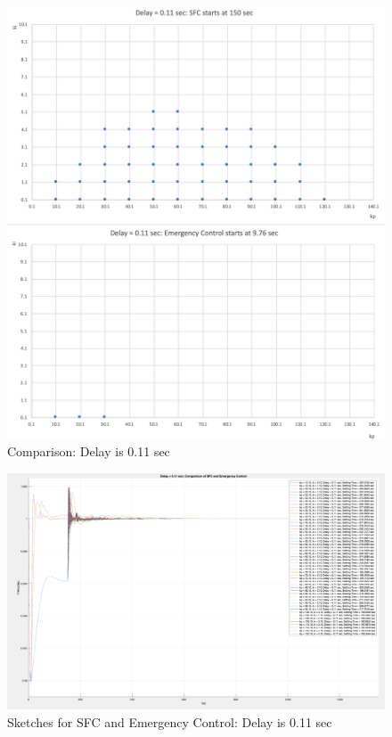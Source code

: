 \begin{figure}[htbp]
\centering
\includegraphics[width = .891\textwidth]{figure/6_4_copare_11.png}
\caption{Comparison: Delay is 0.11 sec}
\label{6_4_copare_11}
\end{figure}


\begin{figure}[htbp]
\centering
\includegraphics[width = .891\textwidth]{figure/6_4_CompaPlots_11.png}
\caption{Sketches for SFC and Emergency Control: Delay is 0.11 sec}
\label{6_4_CompaPlots_11}
\end{figure}


